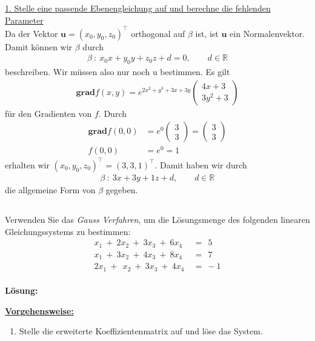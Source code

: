 \underline{1. Stelle eine passende Ebenengleichung auf und berechne die fehlenden Parameter}\\
Da der Vektor $\textbf{u} = (x_0,y_0,z_0)^\top$ orthogonal auf $\beta$ ist, ist $\textbf{u}$ ein Normalenvektor.
Damit können wir $\beta$ durch
\begin{align*}
\beta \ : \ x_0 x + y_0 y + z_0 z + d  = 0, \qquad d \in \mathbb{R}
\end{align*}
beschreiben.
Wir müssen also nur noch $\text{u}$ bestimmen.
Es gilt  
\begin{align*}
\textbf{grad} f(x,y) = e^{2x^2+y^3 +3x +3y} 
\begin{pmatrix}
4 x+ 3\\
3 y^2 + 3 
\end{pmatrix}
\end{align*}
für den Gradienten von $f$.
Durch
\begin{align*}
\textbf{grad} f(0 ,0)&=
e^0
\begin{pmatrix}
3\\
3
\end{pmatrix}
=
\begin{pmatrix}
3\\
3
\end{pmatrix} \\
f(0,0) &= e^0 = 1
\end{align*}
erhalten wir $(x_0,y_0,z_0)^\top = ( 3, 3,1)^\top$.
Damit haben wir durch
\begin{align*}
\beta \ : \ 3 x + 3 y + 1 z + d, \qquad d \in \mathbb{R}
\end{align*}
die allgemeine Form von $\beta$ gegeben.
\newpage

\subsection*{}
Verwenden Sie das \textit{Gauss Verfahren}, um die Lösungsmenge des folgenden linearen Gleichungssystems zu bestimmen:
\begin{equation*}
\begin{split}
x_1 \ + \ 2 x_2 \ + \ 3 x_3 \ + \ 6 x_4 \ &= \ \ 5 \\
x_1 \ + \ 3 x_2 \ + \ 4 x_3 \ + \ 8 x_4 \ &= \ \ 7 \\
2 x_1 \ + \ \ x_2 \ + \ 3 x_3 \ + \ 4 x_4 \ &= \ -1
\end{split}
\end{equation*}
\\
\textbf{Lösung:}
\begin{mdframed}
\underline{\textbf{Vorgehensweise:}}
\renewcommand{\labelenumi}{\theenumi.}
\begin{enumerate}
\item Stelle die erweiterte Koeffizientenmatrix auf und löse das System.
\end{enumerate}
\end{mdframed}



